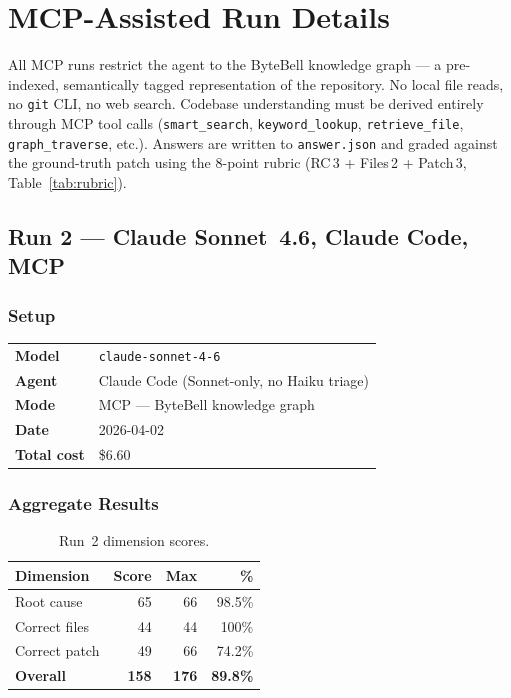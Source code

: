 
\section{MCP-Assisted Run Details}
\label{sec:mcp}

\noindent
All MCP runs restrict the agent to the ByteBell knowledge graph --- a
pre-indexed, semantically tagged representation of the repository.
No local file reads, no \texttt{git} CLI, no web search.
Codebase understanding must be derived entirely through MCP tool calls
(\texttt{smart\_search}, \texttt{keyword\_lookup}, \texttt{retrieve\_file},
\texttt{graph\_traverse}, etc.).
Answers are written to \texttt{answer.json} and graded against the
ground-truth patch using the 8-point rubric
(RC\,3 + Files\,2 + Patch\,3, Table~\ref{tab:rubric}).

\subsection{Run 2 --- Claude Sonnet~4.6, Claude Code, MCP}
\label{sec:run2}

\subsubsection{Setup}

\begin{tabular}{ll}
\textbf{Model}     & \texttt{claude-sonnet-4-6} \\
\textbf{Agent}     & Claude Code (Sonnet-only, no Haiku triage) \\
\textbf{Mode}      & MCP --- ByteBell knowledge graph \\
\textbf{Date}      & 2026-04-02 \\
\textbf{Total cost} & \$6.60 \\
\end{tabular}

\subsubsection{Aggregate Results}

\begin{table}[h]
\centering
\caption{Run~2 dimension scores.}\label{tab:r2-dim}
\begin{tabular}{lrrr}
\toprule
\textbf{Dimension} & \textbf{Score} & \textbf{Max} & \textbf{\%} \\
\midrule
Root cause         & 65 & 66 & 98.5\% \\
Correct files      & 44 & 44 & 100\%  \\
Correct patch      & 49 & 66 & 74.2\% \\
\midrule
\textbf{Overall}   & \textbf{158} & \textbf{176} & \textbf{89.8\%} \\
\bottomrule
\end{tabular}
\end{table}

